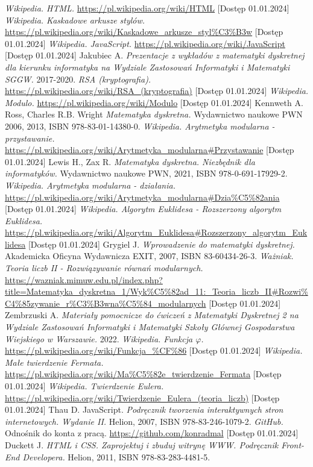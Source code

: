 \documentclass{SGGW-thesis}
\begin{document}
	\begin{thebibliography}{10}
		\textit{Wikipedia. HTML.}
		\url{https://pl.wikipedia.org/wiki/HTML}
		[Dostęp 01.01.2024]
		\textit{Wikipedia. Kaskadowe arkusze stylów.}
		\url{https://pl.wikipedia.org/wiki/Kaskadowe_arkusze_styl%C3%B3w}
		[Dostęp 01.01.2024]
		\textit{Wikipedia. JavaScript.}
		\url{https://pl.wikipedia.org/wiki/JavaScript}
		[Dostęp 01.01.2024]
		Jakubiec A. \textit{Prezentacje z wykładów z matematyki dyskretnej dla kierunku informatyka na Wydziale Zastosowań Informatyki i Matematyki SGGW.} 2017-2020.
		\textit{RSA (kryptografia).}
		\url{https://pl.wikipedia.org/wiki/RSA_(kryptografia)}
		[Dostęp 01.01.2024]
		\textit{Wikipedia. Modulo.}
		\url{https://pl.wikipedia.org/wiki/Modulo}
		[Dostęp 01.01.2024]
		Kennweth A. Ross, Charles R.B. Wright \textit{Matematyka dyskretna.} Wydawnictwo naukowe PWN 2006, 2013, ISBN 978-83-01-14380-0.
		\textit{Wikipedia. Arytmetyka modularna - przystawanie.}
		\url{https://pl.wikipedia.org/wiki/Arytmetyka_modularna#Przystawanie}
		[Dostęp 01.01.2024]
		Lewis H., Zax R. \textit{Matematyka dyskretna. Niezbędnik dla informatyków.} Wydawnictwo naukowe PWN, 2021, ISBN 978-0-691-17929-2.
		\textit{Wikipedia. Arytmetyka modularna - działania.} \url{https://pl.wikipedia.org/wiki/Arytmetyka_modularna#Dzia%C5%82ania} [Dostęp 01.01.2024]
		\textit{Wikipedia. Algorytm Euklidesa - Rozszerzony algorytm Euklidesa.} \url{https://pl.wikipedia.org/wiki/Algorytm_Euklidesa#Rozszerzony_algorytm_Euklidesa} [Dostęp 01.01.2024]
		Grygiel J. \textit{Wprowadzenie do matematyki dyskretnej.} Akademicka Oficyna Wydawnicza EXIT, 2007, ISBN 83-60434-26-3.
		\textit{Ważniak. Teoria liczb II - Rozwiązywanie równań modularnych.} \url{https://wazniak.mimuw.edu.pl/index.php?title=Matematyka_dyskretna_1/Wyk%C5%82ad_11:_Teoria_liczb_II#Rozwi%C4%85zywanie_r%C3%B3wna%C5%84_modularnych} [Dostęp 01.01.2024]
		Zembrzuski A. \textit{Materiały pomocnicze do ćwiczeń z Matematyki Dyskretnej 2 na Wydziale Zastosowań Informatyki i Matematyki Szkoły Głównej Gospodarstwa Wiejskiego w Warszawie.} 2022.		
		\textit{Wikipedia. Funkcja \(\varphi\).} \url{https://pl.wikipedia.org/wiki/Funkcja_%CF%86} [Dostęp 01.01.2024]
		\textit{Wikipedia. Małe twierdzenie Fermata.} \url{https://pl.wikipedia.org/wiki/Ma%C5%82e_twierdzenie_Fermata} [Dostęp 01.01.2024]
		\textit{Wikipedia. Twierdzenie Eulera.} \url{https://pl.wikipedia.org/wiki/Twierdzenie_Eulera_(teoria_liczb)} [Dostęp 01.01.2024]
		Thau D. JavaScript. \textit{Podręcznik tworzenia interaktywnych stron internetowych. Wydanie II.} Helion, 2007, ISBN 978-83-246-1079-2.
		\textit{GitHub.} Odnośnik do konta z pracą. \url{https://github.com/konradmal} [Dostęp 01.01.2024]
		Duckett J. \textit{HTML i CSS. Zaprojektuj i zbuduj witrynę WWW. Podręcznik Front-End Developera.} Helion, 2011, ISBN 978-83-283-4481-5.
	\end{thebibliography}
	
	\beforelastpage
	
\end{document}
